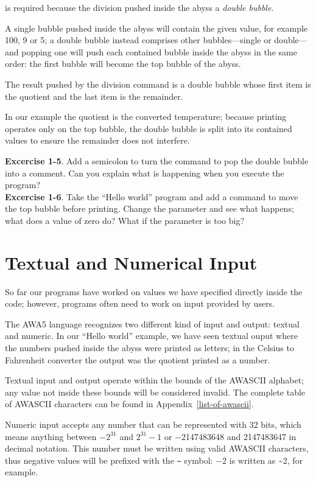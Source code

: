 \documentclass[11pt,a4paper,draft]{book}
\begin{document}
is required because the division pushed inside the abyss a
\emph{double bubble}.

A single bubble pushed inside the abyss will contain the given value,
for example \num{100}, \num{9} or \num{5}; a double bubble instead
comprises other bubbles---single or double---and popping one will push
each contained bubble inside the abyss in the same order: the first
bubble will become the top bubble of the abyss.

The result pushed by the division command is a double bubble whose
first item is the quotient and the last item is the remainder.

In our example the quotient is the converted temperature; because
printing operates only on the top bubble, the double bubble is split
into its contained values to ensure the remainder does not interfere.

\textbf{Excercise 1-5}. Add a semicolon to turn the command to pop the
double bubble into a comment. Can you explain what is happening when
you execute the program? \\
\textbf{Excercise 1-6}. Take the \enquote{Hello world} program and add
a command to move the top bubble before printing. Change the parameter
and see what happens; what does a value of zero do? What if the
parameter is too big?

\section{Textual and Numerical Input}
So far our programs have worked on values we have specified directly
inside the code; however, programs often need to work on input
provided by users.

The AWA5 language recognizes two different kind of input and output:
textual and numeric. In our \enquote{Hello world} example, we have
seen textual ouput where the numbers pushed inside the abyss were
printed as letters; in the Celsius to Fahrenheit converter the output
was the quotient printed as a number.

Textual input and output operate within the bounds of the AWASCII
alphabet; any value not inside these bounds will be considered
invalid. The complete table of AWASCII characters can be found in
Appendix~\ref{list-of-awascii}.

Numeric input accepts any number that can be represented with 32 bits,
which means anything between \(-2^{31}\) and \(2^{31}-1\) or
\num{-2147483648} and \num{2147483647} in decimal notation. This
number must be written using valid AWASCII characters, thus negative
values will be prefixed with the \verb|~| symbol: \(-2\) is written as
\~{}2, for example.
\end{document}
